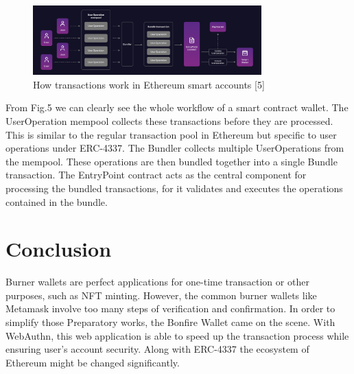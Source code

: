 \documentclass[conference]{IEEEtran}
\begin{document}
\begin{figure}[htbp]
    \centerline{\includegraphics[width=250pt]{How-transactions-work-in-Ethereum-Smart-Accounts---ERC-4337-Account-Abstraction.png}}\label{fig5}
    \caption{How transactions work in Ethereum smart accounts [5]}
    \end{figure}

From Fig.5 we can clearly see the whole workflow of a smart contract wallet. The UserOperation mempool 
collects these transactions before they are processed. This is similar to the regular transaction pool in Ethereum 
but specific to user operations under ERC-4337. The Bundler collects multiple UserOperations from the mempool. 
These operations are then bundled together into a single Bundle transaction. The EntryPoint contract acts as the 
central component for processing the bundled transactions, for it validates and executes the operations contained in 
the bundle.

\section{Conclusion}
Burner wallets are perfect applications for one-time transaction or other purposes, such as NFT minting. However, the 
common burner wallets like Metamask involve too many steps of verification and confirmation. In order to simplify those 
Preparatory works, the Bonfire Wallet came on the scene. With WebAuthn, this web application is able to speed up the 
transaction process while ensuring user's account security. Along with ERC-4337 the ecosystem of Ethereum might be
changed significantly.
\end{document}
